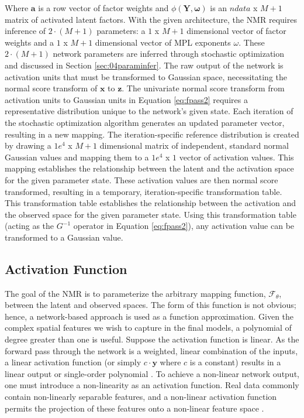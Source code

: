 Where $\mathbf{a}$ is a row vector of factor weights and $\phi\left(\mathbf{Y}, \boldsymbol{\omega} \right)$ is an $ndata$ x $M+1$ matrix of activated latent factors. With the given architecture, the \gls{NMR} requires inference of $2 \cdot (M+1)$ parameters: a $1$ x $M+1$ dimensional vector of factor weights and a $1$ x $M+1$ dimensional vector of \gls{MPL} exponents $\omega$. These $2 \cdot (M+1)$ network parameters are inferred through stochastic optimization and discussed in Section \ref{sec:04paraminfer}. The raw output of the network is activation units that must be transformed to Gaussian space, necessitating the normal score transform of $\mathbf{x}$ to $\mathbf{z}$. The univariate normal score transform from activation units to Gaussian units in Equation \ref{eq:fpass2} requires a representative distribution unique to the network's given state. Each iteration of the stochastic optimization algorithm generates an updated parameter vector, resulting in a new mapping. The iteration-specific reference distribution is created by drawing a $1e^{4}$ x $M+1$ dimensional matrix of independent, standard normal Gaussian values and mapping them to a $1e^{4}$ x $1$ vector of activation values. This mapping establishes the relationship between the latent and the activation space for the given parameter state. These activation values are then normal score transformed, resulting in a temporary, iteration-specific transformation table. This transformation table establishes the relationship between the activation and the observed space for the given parameter state. Using this transformation table (acting as the $G^{-1}$ operator in Equation \ref{eq:fpass2}), any activation value can be transformed to a Gaussian value.

\subsection{Activation Function}
\label{subsec:04activation}

The goal of the \gls{NMR} is to parameterize the arbitrary mapping function, $\mathcal{F}_{\theta}$, between the latent and observed spaces. The form of this function is not obvious; hence, a network-based approach is used as a function approximation. Given the complex spatial features we wish to capture in the final models, a polynomial of degree greater than one is useful. Suppose the activation function is linear. As the forward pass through the network is a weighted, linear combination of the inputs, a linear activation function (or simply $c \cdot \mathbf{y}$ where $c$ is a constant) results in a linear output or single-order polynomial \citep{sharma2020activation}. To achieve a non-linear network output, one must introduce a non-linearity as an activation function. Real data commonly contain non-linearly separable features, and a non-linear activation function permits the projection of these features onto a non-linear feature space \citep{dubey2022activation}.

